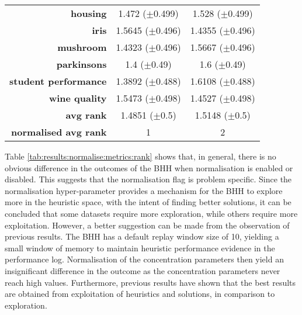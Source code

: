 \begin{table}[htb]
{\begin{tabular}{rcc}
                  \multicolumn{1}{r|}{\textbf{housing}}             & \cellcolor[rgb]{ .388,  .745,  .482}1.472 ($\pm$0.499)    & \cellcolor[rgb]{ .973,  .412,  .42}1.528 ($\pm$0.499)   \\
                  \multicolumn{1}{r|}{\textbf{iris}}                & \cellcolor[rgb]{ .973,  .412,  .42}1.5645 ($\pm$0.496)    & \cellcolor[rgb]{ .388,  .745,  .482}1.4355 ($\pm$0.496) \\
                  \multicolumn{1}{r|}{\textbf{mushroom}}            & \cellcolor[rgb]{ .388,  .745,  .482}1.4323 ($\pm$0.496)   & \cellcolor[rgb]{ .973,  .412,  .42}1.5667 ($\pm$0.496)  \\
                  \multicolumn{1}{r|}{\textbf{parkinsons}}          & \cellcolor[rgb]{ .388,  .745,  .482}1.4 ($\pm$0.49)       & \cellcolor[rgb]{ .973,  .412,  .42}1.6 ($\pm$0.49)      \\
                  \multicolumn{1}{r|}{\textbf{student performance}} & \cellcolor[rgb]{ .388,  .745,  .482}1.3892 ($\pm$0.488)   & \cellcolor[rgb]{ .973,  .412,  .42}1.6108 ($\pm$0.488)  \\
                  \multicolumn{1}{r|}{\textbf{wine quality}}        & \cellcolor[rgb]{ .973,  .412,  .42}1.5473 ($\pm$0.498)    & \cellcolor[rgb]{ .388,  .745,  .482}1.4527 ($\pm$0.498) \\
                  \midrule
                  \multicolumn{1}{r|}{\textbf{avg rank}}            & \cellcolor[rgb]{ .388,  .745,  .482}1.4851 ($\pm$0.5)     & \cellcolor[rgb]{ .973,  .412,  .42}1.5148 ($\pm$0.5)    \\
                  \midrule
                  \textbf{normalised avg rank}                      & \cellcolor[rgb]{ .388,  .745,  .482}1                     & \cellcolor[rgb]{ .973,  .412,  .42}2                    \\
            \end{tabular}%

      }
\end{table}%

Table \ref{tab:results:normalise:metrics:rank} shows that, in general, there is no obvious difference in the outcomes of the \acs{BHH} when normalisation is enabled or disabled. This suggests that the normalisation flag is problem specific. Since the normalisation hyper-parameter provides a mechanism for the \acs{BHH} to explore more in the heuristic space, with the intent of finding better solutions, it can be concluded that some datasets require more exploration, while others require more exploitation. However, a better suggestion can be made from the observation of previous results. The \acs{BHH} has a default replay window size of 10, yielding a small window of memory to maintain heuristic performance evidence in the performance log. Normalisation of the concentration parameters then yield an insignificant difference in the outcome as the concentration parameters never reach high values. Furthermore, previous results have shown that the best results are obtained from exploitation of heuristics and solutions, in comparison to exploration.

